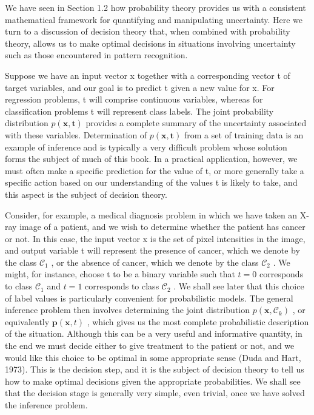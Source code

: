 \documentclass[
  10
]{article}
\begin{document}
We have seen in Section 1.2 how probability theory provides us with a
consistent mathematical framework for quantifying and manipulating
uncertainty. Here we turn to a discussion of decision theory that, when
combined with probability theory, allows us to make optimal decisions in
situations involving uncertainty such as those encountered in pattern
recognition.

Suppose we have an input vector x together with a corresponding vector t
of target variables, and our goal is to predict t given a new value for
x. For regression problems, t will comprise continuous variables,
whereas for classification problems t will represent class labels. The
joint probability distribution \(p ( \mathbf { x } , \mathbf { t } )\)
provides a complete summary of the uncertainty associated with these
variables. Determination of \(p ( \mathbf { x } , \mathbf { t } )\) from
a set of training data is an example of inference and is typically a
very difficult problem whose solution forms the subject of much of this
book. In a practical application, however, we must often make a specific
prediction for the value of t, or more generally take a specific action
based on our understanding of the values t is likely to take, and this
aspect is the subject of decision theory.

Consider, for example, a medical diagnosis problem in which we have
taken an X-ray image of a patient, and we wish to determine whether the
patient has cancer or not. In this case, the input vector x is the set
of pixel intensities in the image, and output variable t will represent
the presence of cancer, which we denote by the class
\(\mathcal { C } _ { 1 }\) , or the absence of cancer, which we denote
by the class \(\mathcal { C } _ { 2 }\) . We might, for instance, choose
t to be a binary variable such that \(t = 0\) corresponds to class
\(\mathcal { C } _ { 1 }\) and \(t = 1\) corresponds to class
\(\mathcal { C } _ { 2 }\) . We shall see later that this choice of
label values is particularly convenient for probabilistic models. The
general inference problem then involves determining the joint
distribution \(p ( \mathbf { x } , \mathcal { C } _ { k } )\) , or
equivalently \(\boldsymbol { p } ( \mathbf { x } , t )\) , which gives
us the most complete probabilistic description of the situation.
Although this can be a very useful and informative quantity, in the end
we must decide either to give treatment to the patient or not, and we
would like this choice to be optimal in some appropriate sense (Duda and
Hart, 1973). This is the decision step, and it is the subject of
decision theory to tell us how to make optimal decisions given the
appropriate probabilities. We shall see that the decision stage is
generally very simple, even trivial, once we have solved the inference
problem.
\end{document}
